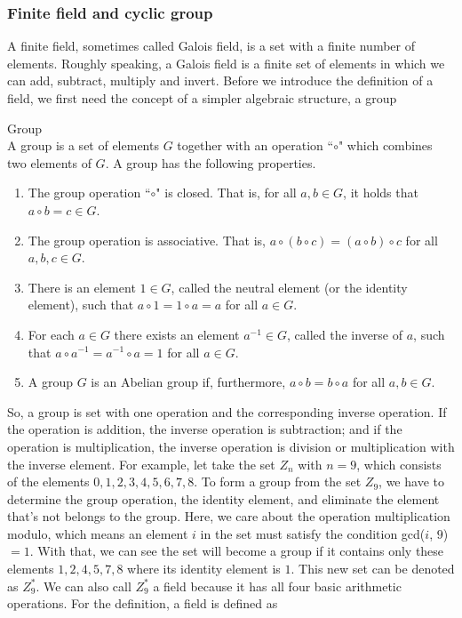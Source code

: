 \subsubsection{Finite field and cyclic group}

A finite field, sometimes called Galois field, is a set with a finite number of elements. Roughly speaking, a Galois field is a finite set of elements in which we can add, subtract, multiply and invert. Before we introduce the definition of a field, we first need the concept of a simpler algebraic structure, a group

\begin{mdframed}[align=center, userdefinedwidth=32em]
    \begin{definition} Group\\
    A group is a set of elements $G$ together with an operation ``$\circ$" which combines two elements of $G$. A group has the following properties.
    \begin{enumerate}
      \item The group operation ``$\circ$" is closed. That is, for all $a,b \in G$, it holds that $a \circ b = c \in G$.
      \item The group operation is associative. That is, $a \circ (b \circ c) = (a \circ b) \circ c$ for all $a, b, c \in G$.
      \item There is an element $1 \in G$, called the neutral element (or the identity element), such that $a \circ 1 = 1 \circ a = a$ for all $a \in G$.
      \item For each $a \in G$ there exists an element $a^{-1} \in G$, called the inverse of $a$, such that $a \circ a^{-1} = a^{-1} \circ a = 1$ for all $a \in G$.
      \item A group $G$ is an Abelian group if, furthermore, $a \circ b = b \circ a$ for all $a, b \in G$.
    \end{enumerate}
    \end{definition}
\end{mdframed}

So, a group is set with one operation and the corresponding inverse operation. If the operation is addition, the inverse operation is subtraction; and if the operation is multiplication, the inverse operation is division or multiplication with the inverse element. For example, let take the set $Z_{n}$ with $n = 9$, which consists of the elements ${0, 1, 2, 3, 4, 5, 6, 7, 8}$. To form a group from the set $Z_{9}$, we have to determine the group operation, the identity element, and eliminate the element that's not belongs to the group. Here, we care about the operation multiplication modulo, which means an element $i$ in the set must satisfy the condition gcd($i$, $9$) $= 1$. With that, we can see the set will become a group if it contains only these elements ${1, 2, 4, 5, 7, 8}$ where its identity element is $1$. This new set can be denoted as $Z^{*}_{9}$. We can also call $Z^{*}_{9}$ a field because it has all four basic arithmetic operations. For the definition, a field is defined as

